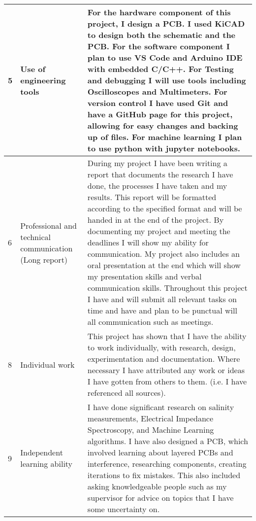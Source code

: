\begin{center}
\begin{longtable}{||p{2em}|p{15em}|p{20em}||}
5 & Use of engineering tools &
For the hardware component of this project, I design a PCB. I used KiCAD to design both the schematic and the PCB. For the software component I plan to use VS Code and Arduino IDE with embedded C/C++. For Testing and debugging I will use tools including Oscilloscopes and Multimeters. For version control I have used Git and have a GitHub page for this project, allowing for easy changes and backing up of files. For machine learning I plan to use python with jupyter notebooks. \\ \hline

6 & Professional and technical communication (Long report) &
During my project I have been writing a report that documents the research I have done, the processes I have taken and my results. This report will be formatted according to the specified format and will be handed in at the end of the project. By documenting my project and meeting the deadlines I will show my ability for communication. My project also includes an oral presentation at the end which will show my presentation skills and verbal communication skills. Throughout this project I have and will submit all relevant tasks on time and have and plan to be punctual will all communication such as meetings. \\ \hline

8 & Individual work &
This project has shown that I have the ability to work individually, with research, design, experimentation and documentation. Where necessary I have attributed any work or ideas I have gotten from others to them. (i.e. I have referenced all sources). \\ \hline

9 & Independent learning ability &
I have done significant research on salinity measurements, Electrical Impedance Spectroscopy, and Machine Learning algorithms. I have also designed a PCB, which involved learning about layered PCBs and interference, researching components, creating iterations to fix mistakes. This also included asking knowledgeable people such as my supervisor for advice on topics that I have some uncertainty on. \\ [1ex]
\hline

\end{longtable}
\end{center}
